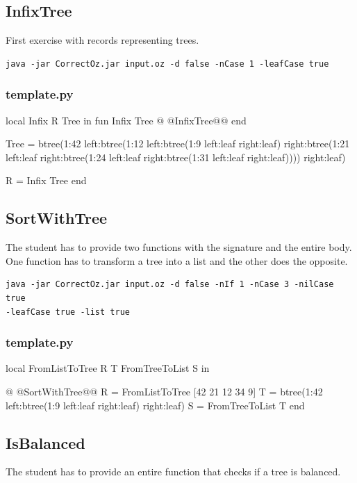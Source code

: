 \documentclass[11pt,a4paper,twoside,openright]{report}
\begin{document}
\subsection{InfixTree}
First exercise with records representing trees. 
\begin{lstlisting}
java -jar CorrectOz.jar input.oz -d false -nCase 1 -leafCase true 
\end{lstlisting}

\subsubsection*{template.py}
\begin{OZ}
local Infix R Tree in 
	fun {Infix Tree}
@	@InfixTree@@
	end

	Tree = btree(1:42 left:btree(1:12 left:btree(1:9 left:leaf right:leaf) 
right:btree(1:21 left:leaf right:btree(1:24 left:leaf right:btree(1:31 
left:leaf right:leaf)))) right:leaf)
	
	R = {Infix Tree}
end
\end{OZ}

\subsection{SortWithTree}
The student has to provide two functions with the signature and the entire 
body. One function has to transform a tree into a list and the other does the 
opposite. 

\begin{lstlisting}
java -jar CorrectOz.jar input.oz -d false -nIf 1 -nCase 3 -nilCase true 
-leafCase true -list true 
\end{lstlisting}

\subsubsection*{template.py}
\begin{OZ}
local FromListToTree R T FromTreeToList S in

@	@SortWithTree@@
	R = {FromListToTree [42 21 12 34 9]}
	T = btree(1:42 left:btree(1:9 left:leaf right:leaf) right:leaf)
	S = {FromTreeToList T}
end
\end{OZ}


\subsection{IsBalanced}
The student has to provide an entire function that checks if a tree is 
balanced. 
\end{document}
